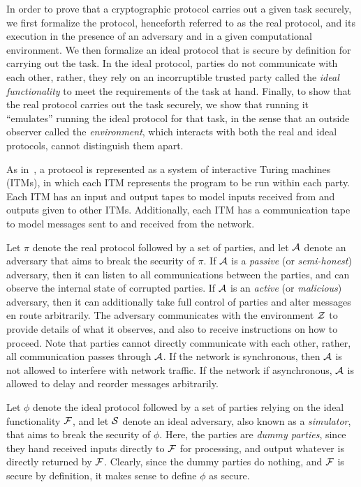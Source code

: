 \documentclass[acmsmall,review,anonymous]{acmart}\settopmatter{printfolios=true,printccs=false,printacmref=false}
\begin{document}
In order to prove that a cryptographic protocol carries out a given task
securely, we first formalize the protocol, henceforth referred to as the real
protocol, and its execution in the presence of an adversary and in a given
computational environment. We then formalize an ideal protocol that is secure by
definition for carrying out the task. In the ideal protocol, parties do not
communicate with each other, rather, they rely on an incorruptible trusted party
called the \emph{ideal functionality} to meet the requirements of the task at
hand. Finally, to show that the real protocol carries out the task securely, we
show that running it ``emulates'' running the ideal protocol for that task, in
the sense that an outside observer called the \emph{environment}, which
interacts with both the real and ideal protocols, cannot distinguish them apart.

As in~\cite{goldwasser1989knowledge}, a protocol is represented as a system of
interactive Turing machines (ITMs), in which each ITM represents the program to
be run within each party. Each ITM has an input and output tapes to model inputs
received from and outputs given to other ITMs. Additionally, each ITM has a
communication tape to model messages sent to and received from the network.

Let $\pi$ denote the real protocol followed by a set of parties, and let $\mathcal{A}$
denote an adversary that aims to break the security of $\pi$. If $\mathcal{A}$ is
a \emph{passive} (or \emph{semi-honest}) adversary, then it can listen to all
communications between the parties, and can observe the internal state of
corrupted parties. If $\mathcal{A}$ is an \emph{active} (or \emph{malicious})
adversary, then it can additionally take full control of parties and alter
messages en route arbitrarily. The adversary communicates with the environment
$\mathcal{Z}$ to provide details of what it observes, and also to receive
instructions on how to proceed. Note that parties cannot directly communicate
with each other, rather, all communication passes through $\mathcal{A}$. If the
network is synchronous, then $\mathcal{A}$ is not allowed to interfere with network
traffic. If the network if asynchronous, $\mathcal{A}$ is allowed to delay and
reorder messages arbitrarily.

Let $\phi$ denote the ideal protocol followed by a set of parties relying on the
ideal functionality $\mathcal{F}$, and let $\mathcal{S}$ denote an ideal adversary, also
known as a \emph{simulator}, that aims to break the security of $\phi$. Here, the
parties are \emph{dummy parties}, since they hand received inputs directly to
$\mathcal{F}$ for processing, and output whatever is directly returned by
$\mathcal{F}$. Clearly, since the dummy parties do nothing, and $\mathcal{F}$ is secure by
definition, it makes sense to define $\phi$ as secure.
\end{document}
